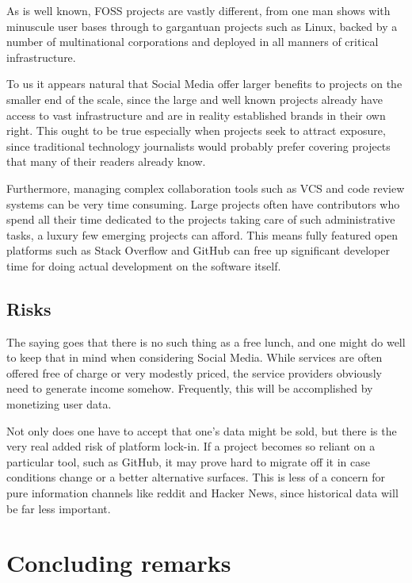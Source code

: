 \documentclass[a4paper,11pt]{article} %
\begin{document}
As is well known, FOSS projects are vastly different, from one man
shows with minuscule user bases through to gargantuan projects such as
Linux, backed by a number of multinational corporations and deployed
in all manners of critical infrastructure.

To us it appears natural that Social Media offer larger benefits to
projects on the smaller end of the scale, since the large and well
known projects already have access to vast infrastructure and are in
reality established brands in their own right. This ought to be true
especially when projects seek to attract exposure, since traditional
technology journalists would probably prefer covering projects that
many of their readers already know.

Furthermore, managing complex collaboration tools such as VCS and code
review systems can be very time consuming. Large projects often have
contributors who spend all their time dedicated to the projects taking
care of such administrative tasks, a luxury few emerging projects can
afford. This means fully featured open platforms such as Stack
Overflow and GitHub can free up significant developer time for doing
actual development on the software itself.

\subsection{Risks}

The saying goes that there is no such thing as a free lunch, and one
might do well to keep that in mind when considering Social
Media. While services are often offered free of charge or very
modestly priced, the service providers obviously need to generate
income somehow. Frequently, this will be accomplished by monetizing
user data.

Not only does one have to accept that one's data might be sold, but
there is the very real added risk of platform lock-in. If a project
becomes so reliant on a particular tool, such as GitHub, it may prove
hard to migrate off it in case conditions change or a better
alternative surfaces. This is less of a concern for pure information
channels like reddit and Hacker News, since historical data will be
far less important.

\section{Concluding remarks}

\newpage
\printbibliography
\end{document}

